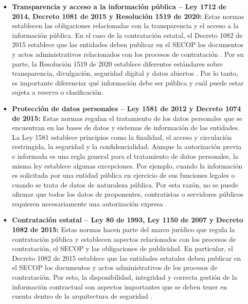 \begin{itemize}
    \item \textbf{Transparencia y acceso a la información pública -- Ley 1712 de 2014, Decreto 1081 de 2015 y Resolución 1519 de 2020:} Estas normas establecen las obligaciones relacionadas con la transparencia y el acceso a la información pública. En el caso de la contratación estatal, el Decreto 1082 de 2015 establece que las entidades deben publicar en el SECOP los documentos y actos administrativos relacionados con los procesos de contratación \parencite{decreto1082de2015}. Por su parte, la Resolución 1519 de 2020 establece diferentes estándares sobre transparencia, divulgación, seguridad digital y datos abiertos \parencite{res1519de2020}. Por lo tanto, es importante diferenciar qué información debe ser pública y cuál puede estar sujeta a reserva o clasificación.

    \item \textbf{Protección de datos personales -- Ley 1581 de 2012 y Decreto 1074 de 2015:} Estas normas regulan el tratamiento de los datos personales que se encuentran en las bases de datos y sistemas de información de las entidades. La Ley 1581 establece principios como la finalidad, el acceso y circulación restringida, la seguridad y la confidencialidad. Aunque la autorización previa e informada es una regla general para el tratamiento de datos personales, la misma ley establece algunas excepciones. Por ejemplo, cuando la información es solicitada por una entidad pública en ejercicio de sus funciones legales o cuando se trata de datos de naturaleza pública. Por esta razón, no se puede afirmar que todos los datos de proponentes, contratistas o servidores públicos requieren necesariamente una autorización expresa \parencite{ley1581de2012,decreto1074de2015}.

    \item \textbf{Contratación estatal -- Ley 80 de 1993, Ley 1150 de 2007 y Decreto 1082 de 2015:} Estas normas hacen parte del marco jurídico que regula la contratación pública y establecen aspectos relacionados con los procesos de contratación, el SECOP y las obligaciones de publicidad. En particular, el Decreto 1082 de 2015 establece que las entidades estatales deben publicar en el SECOP los documentos y actos administrativos de los procesos de contratación. Por esto, la disponibilidad, integridad y correcta gestión de la información contractual son aspectos importantes que se deben tener en cuenta dentro de la arquitectura de seguridad \parencite{decreto1082de2015}.


\end{itemize}

